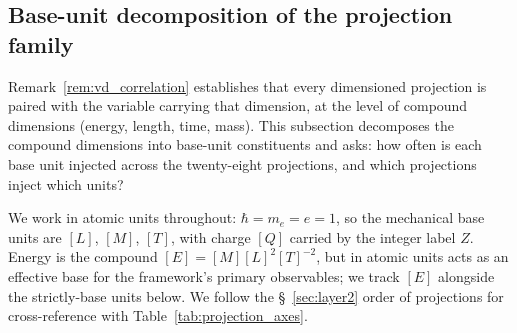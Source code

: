 \documentclass[11pt]{article}
\begin{document}
\subsection{Base-unit decomposition of the projection family}
\label{sec:base_units}

Remark~\ref{rem:vd_correlation} establishes that every dimensioned
projection is paired with the variable carrying that dimension, at
the level of compound dimensions (energy, length, time, mass).  This
subsection decomposes the compound dimensions into base-unit
constituents and asks: how often is each base unit injected across
the twenty-eight projections, and which projections inject which units?

We work in atomic units throughout: $\hbar = m_e = e = 1$, so the
mechanical base units are $[L]$, $[M]$, $[T]$, with charge $[Q]$
carried by the integer label $Z$.  Energy is the compound
$[E] = [M][L]^2[T]^{-2}$, but in atomic units acts as an effective
base for the framework's primary observables; we track $[E]$
alongside the strictly-base units below.  We follow the
\S~\ref{sec:layer2} order of projections for cross-reference with
Table~\ref{tab:projection_axes}.
\end{document}
